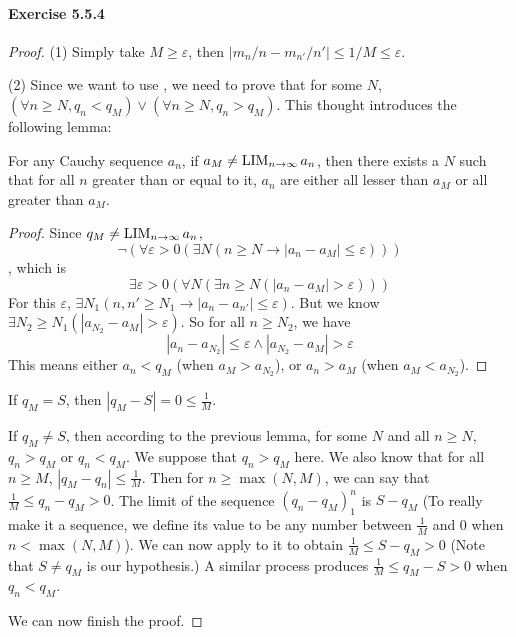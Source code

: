 \paragraph{Exercise 5.5.4} \label{exercise5.5.4}
\begin{proof}
(1) Simply take $M \geq \varepsilon$, then $|m_n/n-m_{n'}/n'|\leq 1/M\leq \varepsilon$.

(2)
Since we want to use , we need to prove that for some $N$, $(\forall n \geq N, q_n < q_M) \vee (\forall n \geq N, q_n > q_M)$. This thought introduces the following lemma:
\begin{lem}
For any Cauchy sequence $a_n$, if $a_M \neq \operatorname*{LIM}_{n \to \infty}{a_n}$, then there exists a $N$ such that for all $n$ greater than or equal to it, $a_n$ are either all lesser than $a_M$ or all greater than $a_M$.
\end{lem}
\begin{proof}
Since $q_M \neq \operatorname*{LIM}_{n \to \infty}{a_n}$,
\[
\neg (\forall \varepsilon>0(\exists N(n\geq N \to |a_n-a_M| \leq \varepsilon) ))
\]
, which is
\[
\exists \varepsilon >0 (\forall N(\exists n\geq N(|a_n-a_M| > \varepsilon)))
\]
For this $\varepsilon$, $\exists N_1(n,n'\geq N_1 \to |a_n-a_{n'}| \leq \varepsilon)$. But we know $\exists N_2 \geq N_1(|a_{N_2}-a_M| > \varepsilon)$. So for all $n \geq N_2$, we have
\[
|a_n-a_{N_2}| \leq \varepsilon \wedge |a_{N_2} - a_M| > \varepsilon
\]
This means either $a_n < q_{M}$ (when $a_M > a_{N_2}$), or $a_n > a_{M}$ (when $a_M < a_{N_2}$).
\end{proof}

If $q_M = S$, then $|q_M-S| = 0 \leq \frac{1}{M}$.

If $q_M \neq S$, then according to the previous lemma, for some $N$ and all $n\geq N$, $q_n > q_M$ or $q_n<q_M$. We suppose that $q_n > q_M$ here. We also know that for all $n\geq M$, $|q_M - q_n| \leq \frac{1}{M}$. Then for $n \geq \max(N,M)$, we can say that $\frac{1}{M} \leq q_n - q_M >0$. The limit of the sequence $(q_n-q_M)_1^n$ is $S-q_M$ (To really make it a sequence, we define its value to be any number between $\frac{1}{M}$ and 0 when $n < \max(N,M)$). We can now apply  to it to obtain $\frac{1}{M}\leq S-q_M >0$ (Note that $S \neq q_M$ is our hypothesis.) A similar process produces $\frac{1}{M}\leq q_M-S >0$ when $q_n<q_M$. 

We can now finish the proof.
\end{proof}

